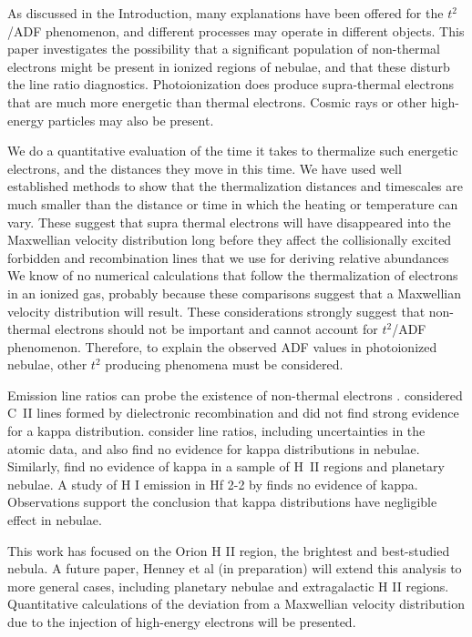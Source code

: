 \documentclass[debug, preprint, twocolumn]{rmaa}
\begin{document}
As discussed in the Introduction, many explanations have been offered for the $t^2$/ADF phenomenon,
and different processes may operate in different objects.
This paper investigates the possibility that a significant population of
non-thermal electrons might be present in ionized regions of nebulae,
and that these disturb the line ratio diagnostics.
Photoionization does produce supra-thermal electrons that are much more energetic than
thermal electrons. 
Cosmic rays or other high-energy particles may also be present.

We do a quantitative evaluation of the time it takes to thermalize such energetic electrons, and the
distances they move in this time.
We have used well established methods to show that the thermalization distances and 
timescales are much smaller than the distance or time in which the heating or temperature
can vary.
These suggest that
supra thermal electrons will have disappeared into the Maxwellian velocity distribution long before they affect the 
collisionally excited forbidden and recombination lines that we use for deriving relative abundances
We know of no numerical calculations that follow the thermalization of electrons in an ionized gas,
probably because these comparisons suggest that a Maxwellian velocity distribution will result.
These considerations strongly suggest that non-thermal electrons should not be  important 
and cannot account for $t^2$/ADF phenomenon.
Therefore, to explain the observed ADF values in photoionized nebulae, other $t^2$ producing phenomena
must be considered.

Emission line ratios can probe the existence of non-thermal electrons \citep{2013SSRv..178..271B}.
\citet{2013MNRAS.430..599S} considered C~II lines formed by dielectronic recombination
and did not find strong evidence for a kappa distribution.
\citet{2014ApJ...785...91M} consider line ratios, including uncertainties in the atomic data,
and also find no evidence for kappa distributions in nebulae.
Similarly, \citet{2016ApJ...817...68Z} find no evidence of kappa in a sample of H~II regions
and planetary nebulae.
A study of H I emission in Hf 2-2 by \citet{2014MNRAS.440.2581S} finds no evidence of kappa.
Observations support the conclusion that kappa distributions have negligible effect in nebulae.

This work has focused on the Orion H II region, the brightest and best-studied nebula.  A future paper, Henney et al (in preparation) will extend this analysis to more general cases, including planetary nebulae and extragalactic H II regions.  Quantitative calculations of the deviation from a Maxwellian velocity distribution due to the injection of high-energy electrons will be presented.
\end{document}
